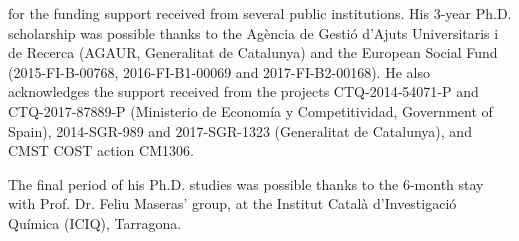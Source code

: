 
 for the funding support received from several public institutions. His 3-year Ph.D. scholarship was possible thanks to the Agència de Gestió d'Ajuts Universitaris i de Recerca (AGAUR, Generalitat de Catalunya) and the European Social Fund (2015-FI-B-00768, 2016-FI-B1-00069 and 2017-FI-B2-00168). He also acknowledges the support received from the projects CTQ-2014‐54071‐P and CTQ-2017-87889-P (Ministerio de Economía y Competitividad, Government of Spain), 2014-SGR-989 and 2017-SGR-1323 (Generalitat de Catalunya), and CMST COST action CM1306.

The final period of his Ph.D. studies was possible thanks to the 6-month stay with Prof. Dr. Feliu Maseras' group, at the Institut Català d'Investigació Química (ICIQ), Tarragona.

~ \\
